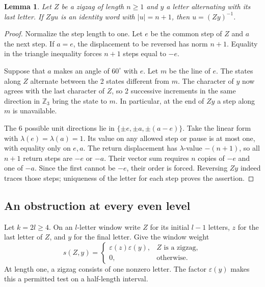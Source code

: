 \documentclass[11pt,a4paper]{amsart}
\newtheorem{lemma}[theorem]{Lemma}
\begin{document}
\begin{lemma}\label{lem:rigid}
Let $Z$ be a zigzag of length $n\geq1$ and $y$ a letter alternating with its last letter. If $Zyu$ is an identity word with $|u|=n+1$, then $u=(Zy)^{-1}$.
\end{lemma}
\begin{proof}
Normalize the step length to one. Let $e$ be the common step of $Z$ and $a$ the next step. If $a=e$, the displacement to be reversed has norm $n+1$. Equality in the triangle inequality forces $n+1$ steps equal to $-e$.

Suppose that $a$ makes an angle of $60^\circ$ with $e$. Let $m$ be the line of $e$. The states along $Z$ alternate between the 2 states different from $m$. The character of $y$ now agrees with the last character of $Z$, so 2 successive increments in the same direction in $\mathbb Z_3$ bring the state to $m$. In particular, at the end of $Zy$ a step along $m$ is unavailable.

The 6 possible unit directions lie in $\{\pm e,\pm a,\pm(a-e)\}$. Take the linear form with $\lambda(e)=\lambda(a)=1$. Its value on any allowed step or pause is at most one, with equality only on $e,a$. The return displacement has $\lambda$-value $-(n+1)$, so all $n+1$ return steps are $-e$ or $-a$. Their vector sum requires $n$ copies of $-e$ and one of $-a$. Since the first cannot be $-e$, their order is forced. Reversing $Zy$ indeed traces those steps; uniqueness of the letter for each step proves the assertion.
\end{proof}

\subsection{An obstruction at every even level}
Let $k=2l\geq4$. On an $l$-letter window write $Z$ for its initial $l-1$ letters, $z$ for the last letter of $Z$, and $y$ for the final letter. Give the window weight
\[
 s(Z,y)=
 \begin{cases}
 \varepsilon(z)\varepsilon(y),& Z\text{ is a zigzag},\\
 0,&\text{otherwise}.
 \end{cases}
\]
At length one, a zigzag consists of one nonzero letter. The factor $\varepsilon(y)$ makes this a permitted test on a half-length interval.
\end{document}

